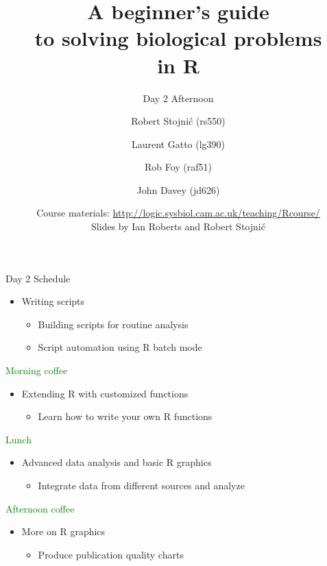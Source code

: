 \documentclass{beamer}
\title[Cambridge R Course]{A beginner's guide\\to solving biological problems\\in R}
\subtitle{Day 2 Afternoon\\}
\author[]{Robert Stojni\'{c} (rs550) \and Laurent Gatto (lg390) \and Rob Foy (raf51) \and John Davey (jd626)}
\date[]{Course materials: \url{http://logic.sysbiol.cam.ac.uk/teaching/Rcourse/}\\Slides by Ian Roberts and Robert Stojni\'{c}}
\begin{document}
\begin{frame}
    \titlepage
\end{frame}


\begin{frame}{Day 2 Schedule}

\begin{itemize}
  \item Writing scripts
  \begin{itemize}
      \item Building scripts for routine analysis
      \item Script automation using R batch mode
  \end{itemize}
\end{itemize}
\textcolor{green}{Morning coffee}
\begin{itemize}
  \item Extending R with customized functions
  \begin{itemize}
      \item Learn how to write your own R functions
  \end{itemize}
\end{itemize}
\textcolor{green}{Lunch}
\begin{itemize}
    \item Advanced data analysis and basic R graphics
    \begin{itemize}
        \item Integrate data from different sources and analyze
    \end{itemize}
\end{itemize}
\textcolor{green}{Afternoon coffee}
\begin{itemize}
    \item More on R graphics
    \begin{itemize}
        \item Produce publication quality charts
    \end{itemize}
\end{itemize}

\end{frame}
\end{document}
